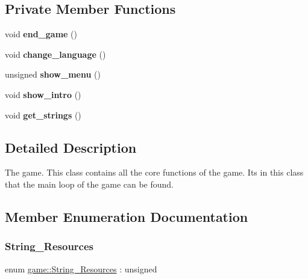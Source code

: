 \subsection*{Private Member Functions}
\begin{DoxyCompactItemize}
\item 
\mbox{\label{classgame_a239e8422b8b98eab25bc210f229458f8}} 
void {\bfseries end\+\_\+game} ()
\item 
\mbox{\label{classgame_ab1024c2d2a3eac9734519285ff337a5f}} 
void {\bfseries change\+\_\+language} ()
\item 
\mbox{\label{classgame_a8ff791657d7ac0576c4f91f12238ae44}} 
unsigned {\bfseries show\+\_\+menu} ()
\item 
\mbox{\label{classgame_aaf9658ba37ce904423fa94b6d4a3104e}} 
void {\bfseries show\+\_\+intro} ()
\item 
\mbox{\label{classgame_a75d8297f6bcfe62c86653174d36cad9b}} 
void {\bfseries get\+\_\+strings} ()
\end{DoxyCompactItemize}


\subsection{Detailed Description}
The game. This class contains all the core functions of the game. It\textquotesingle{}s in this class that the main loop of the game can be found. 

\subsection{Member Enumeration Documentation}
\mbox{\label{classgame_a750823afdadfbde9c945b9d0703c499d}} 
\subsubsection{\texorpdfstring{String\_Resources}{String\_Resources}}
{\footnotesize\ttfamily enum \mbox{\hyperlink{classgame_a750823afdadfbde9c945b9d0703c499d}{game\+::\+String\+\_\+\+Resources}} \+: unsigned\hspace{0.3cm}{\ttfamily [protected]}}



